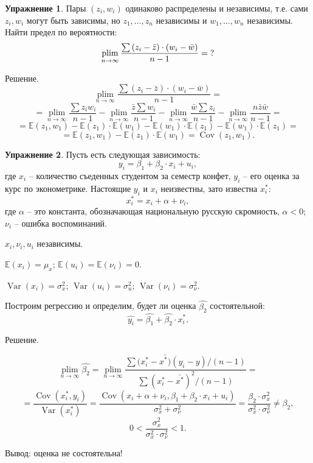 \documentclass[12pt]{article} %
\theoremstyle{definition} %
\newtheorem{exercise}{Упражнение}[section]
\DeclareMathOperator{\Cov}{Cov}
\DeclareMathOperator{\Var}{Var}
\DeclareMathOperator{\plim}{plim}
\begin{document}
\begin{exercise}
Пары $(z_i, w_i)$ одинаково распределены и независимы, т.е. сами $z_i, w_i$ могут быть зависимы, но $z_1, \ldots, z_n$ независимы и $w_1, \ldots, w_n$ независимы. Найти предел по вероятности:
\[\plim\limits_{n\to\infty} \frac{\sum{(z_i-\bar{z})\cdot(w_i-\bar{w})}}{n-1} = \\
?\]

Решение.
\[
\plim\limits_{n\to\infty} \frac{\sum{(z_i-\bar{z})\cdot(w_i-\bar{w})}}{n-1} =
\]
\[=
\plim\limits_{n\to\infty}\frac{\sum{z_i w_i}}{n-1} - \plim\limits_{n\to\infty}\frac{\bar{z}\sum{w_i}}{n-1} - \plim\limits_{n\to\infty}\frac{\bar{w}\sum{z_i}}{n-1} - \plim\limits_{n\to\infty}\frac{n\bar{z}\bar{w}}{n-1}
=
\]
\[=
\mathbb{E}(z_1, w_1) - \mathbb{E}(z_1)\cdot\mathbb{E}(w_1) - \mathbb{E}(w_1)\cdot\mathbb{E}(z_1) - \mathbb{E}(w_1)\cdot\mathbb{E}(z_1) =
\]
\[=
\mathbb{E}(z_1, w_1) - \mathbb{E}(z_1)\cdot\mathbb{E}(w_1) = \Cov(z_1, w_1).
\]


\end{exercise}

\begin{exercise}
Пусть есть следующая зависимость:
\[ y_i = \beta_1 + \beta_2 \cdot x_i + u_i,
\]
где $x_i$ -- количество съеденных студентом за семестр конфет, $y_i$ -- его оценка за курс по эконометрике. Настоящие $y_i$ и $x_i$ неизвестны, зато известна $x_i^*$:
\[
x_i^* = x_i + \alpha + \nu_i,
\]
где $\alpha$ -- это константа, обозначающая национальную русскую скромность, $\alpha < 0$; $\nu_i$ -- ошибка воспоминаний.

$x_i, \nu_i,  u_i$ независимы.

$\mathbb{E}(x_i) = \mu_x$; $\mathbb{E}(u_i) = \mathbb{E}(\nu_i) = 0$.

$\Var(x_i) = \sigma_x^2$;
$\Var(u_i) = \sigma_u^2$;
$\Var(\nu_i) = \sigma_{\nu}^2$.

Построим регрессию и определим, будет ли оценка $\hat{\beta_2}$ состоятельной:
\[
\hat{y_i} = \hat{\beta_1} + \hat{\beta_2} \cdot x_i^*.
\]

Решение.

\[
\plim\limits_{n\to\infty}\hat{\beta_2} = \plim\limits_{n\to\infty}\frac{\sum{(x_i^* - \bar{x^*)}(y_i - y)/(n - 1)}}{\sum{(x_i^* - \bar{x^*})^2}/(n-1)}=
\]
\[=
\frac{\Cov(x_i^*, y_i)}{\Var(x_i^*)} = \frac{\Cov(x_i + \alpha +\nu_i, \beta_1 + \beta_2 \cdot x_i + u_i)}{\sigma_x^2 + \sigma_\nu^2} = \frac{\beta_2 \cdot \sigma_x^2}{\sigma_x^2 \cdot \sigma_\nu^2} \neq \beta_2,
\]
\[
0 < \frac{\sigma_x^2}{\sigma_x^2 \cdot \sigma_\nu^2} < 1.
\]

Вывод: оценка не состоятельна!
\end{exercise}
\end{document}
